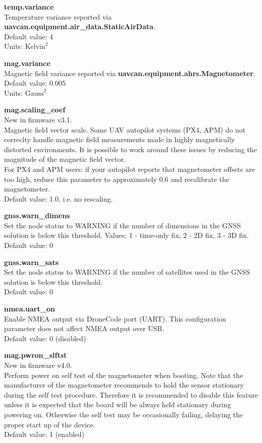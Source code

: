 \documentclass{zubaxdoc}
\begin{document}
\textbf{temp.variance}\\
Temperature variance reported via \textbf{uavcan.equipment.air{\_}data.StaticAirData}.\\
Default value: 4\\
Units: $\text{Kelvin}^2$

\textbf{mag.variance}\\
Magnetic field variance reported via \textbf{uavcan.equipment.ahrs.Magnetometer}.\\
Default value: 0.005\\
Units: $\text{Gauss}^2$

\textbf{mag.scaling{\_}coef}\\
New in firmware v3.1.\\
Magnetic field vector scale. Some UAV autopilot systems (PX4, APM) do not correclty handle magnetic field measurements made in highly magnetically distorted environments. It is possible to work around these issues by reducing the magnitude of the magnetic field vector.\\
For PX4 and APM users: if your autopilot reports that magnetometer offsets are too high, reduce this parameter to approximately 0.6 and recalibrate the magnetometer.\\
Default value: 1.0, i.e. no rescaling.

\textbf{gnss.warn{\_}dimens}\\
Set the node status to WARNING if the number of dimensions in the GNSS solution is below this threshold. Values: 1 - time-only fix, 2 - 2D fix, 3 - 3D fix.\\
Default value: 0

\textbf{gnss.warn{\_}sats}\\
Set the node status to WARNING if the number of satellites used in the GNSS solution is below this threshold.\\
Default value: 0

\textbf{nmea.uart{\_}on}\\
Enable NMEA output via DroneCode port (UART). This configuration parameter does not affect NMEA output over USB.\\
Default value: 0 (disabled)

\textbf{mag.pwron{\_}slftst}\\
New in firmware v4.0.\\
Perform power on self test of the magnetometer when booting. Note that the manufacturer of the magnetometer recommends to hold the sensor stationary during the self test procedure. Therefore it is recommended to disable this feature unless it is expected that the board will be always held stationary during powering on. Otherwise the self test may be occasionally failing, delaying the proper start up of the device.\\
Default value: 1 (enabled)
\end{document}
